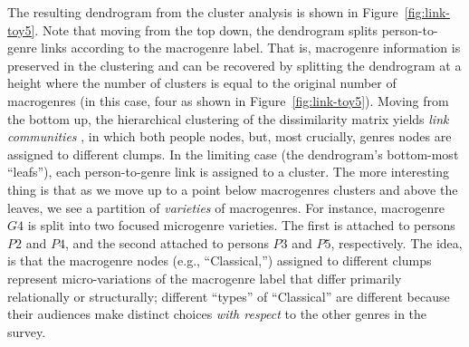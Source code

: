 \documentclass[a4paper,12pt]{extarticle}
\begin{document}
The resulting dendrogram from the cluster analysis is shown in Figure~\ref{fig:link-toy5}. Note that moving from the top down, the dendrogram splits person-to-genre links according to the macrogenre label. That is, macrogenre information is preserved in the clustering and can be recovered by splitting the dendrogram at a height where the number of clusters is equal to the original number of macrogenres (in this case, four as shown in Figure~\ref{fig:link-toy5}). Moving from the bottom up, the hierarchical clustering of the dissimilarity matrix yields {\em link communities} \citep{ahn_etal10}, in which both people nodes, but, most crucially, genres nodes are assigned to different clumps. In the limiting case (the dendrogram's bottom-most ``leafs''), each person-to-genre link is assigned to a cluster. The more interesting thing is that as we move up to a point below macrogenres clusters and above the leaves, we see a partition of {\em varieties} of macrogenres. For instance, macrogenre $G4$ is split into two focused microgenre varieties. The first is attached to persons $P2$ and $P4$, and the second attached to persons $P3$ and $P5$, respectively. The idea, is that the macrogenre nodes (e.g., ``Classical,'') assigned to different clumps represent micro-variations of the macrogenre label that differ primarily relationally or structurally; different ``types'' of ``Classical'' are different because their audiences make distinct choices {\em with respect} to the other genres in the survey. 
\end{document}
